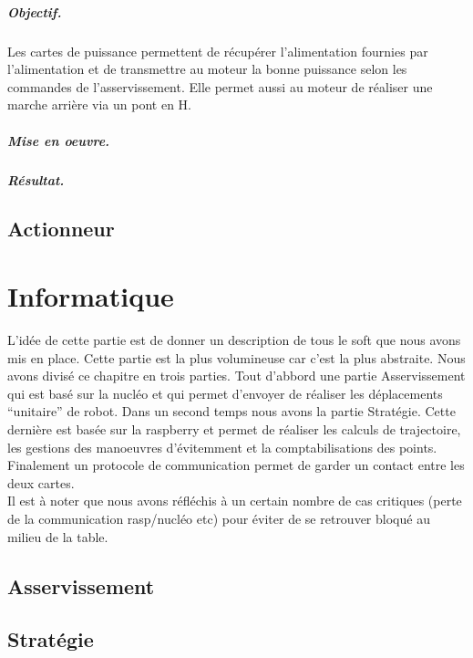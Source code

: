 \documentclass[a4paper,10pt]{report}
\begin{document}
\begin{spacing}{1.5}
\paragraph{Objectif.} Les cartes de puissance permettent de récupérer
l'alimentation fournies par l'alimentation et de transmettre au moteur la bonne
puissance selon les commandes de l'asservissement. Elle permet aussi au moteur
de réaliser une marche arrière via un pont en H.
\paragraph{Mise en oeuvre.}

\paragraph{Résultat.}

\section{Actionneur}

\chapter{Informatique}
L'idée de cette partie est de donner un description de tous le soft que nous
avons mis en place. Cette partie est la plus volumineuse car c'est la plus
abstraite. Nous avons divisé ce chapitre en trois parties. Tout d'abbord une
partie Asservissement qui est basé sur la nucléo et qui permet d'envoyer de
réaliser les déplacements ``unitaire'' de robot. Dans un second temps nous avons
la partie Stratégie. Cette dernière est basée sur la raspberry et permet de
réaliser les calculs de trajectoire, les gestions des manoeuvres d'évitemment et
la comptabilisations des points. Finalement un protocole de communication permet
de garder un contact entre les deux cartes. \\
Il est à noter que nous avons réfléchis à un certain nombre de cas critiques
(perte de la communication rasp/nucléo etc) pour éviter de se retrouver bloqué
au milieu de la table.
\section{Asservissement}
\section{Stratégie}

\end{spacing}
\end{document}
